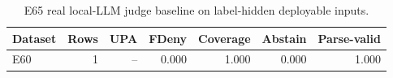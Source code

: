 \begin{table}[t]
\centering
\caption{E65 real local-LLM judge baseline on label-hidden deployable inputs.}
\label{tab:e65-real-llm-judge}
\begin{tabular}{lrrrrrr}
\toprule
Dataset & Rows & UPA & FDeny & Coverage & Abstain & Parse-valid \\
\midrule
E60 & 1 & -- & 0.000 & 1.000 & 0.000 & 1.000 \\
\bottomrule
\end{tabular}
\end{table}

